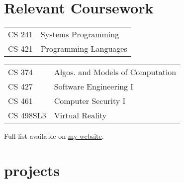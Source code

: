 \documentclass{tccv}
\begin{document}
\section{Relevant Coursework}
\begin{courselist}

  \begin{tabular}{l l}
    CS 241 & Systems Programming \\
    CS 421 & Programming Languages \\
  \end{tabular}

  \begin{tabular}{l l}
    CS 374 & Algos. and Models of Computation \\
    CS 427 & Software Engineering I \\
    CS 461 & Computer Security I \\
    CS 498SL3 & Virtual Reality \\
  \end{tabular}
  \forceskip
  Full list available on \href{https://shotaroikeda.github.io/}{my website}.

\end{courselist}

\section{projects}
\end{document}
